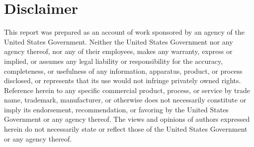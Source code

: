 \documentclass{udthesis}
\begin{document}
    \section*{Disclaimer}
        This report was prepared as an account of work sponsored by an agency of the United States Government. Neither the United States Government nor any agency thereof, nor any of their employees, makes any warranty, express or implied, or assumes any legal liability or responsibility for the accuracy, completeness, or usefulness of any information, apparatus, product, or process disclosed, or represents that its use would not infringe privately owned rights. Reference herein to any specific commercial product, process, or service by trade name, trademark, manufacturer, or otherwise does not necessarily constitute or imply its endorsement, recommendation, or favoring by the United States Government or any agency thereof. The views and opinions of authors expressed herein do not necessarily state or reflect those of the United States Government or any agency thereof.

    \renewcommand{\bibname}{References}
    \pdfstringdefDisableCommands{\let\uppercase\relax}
    
    
\end{document}
